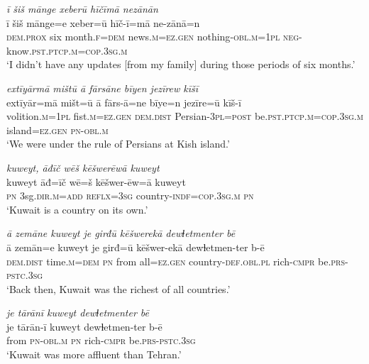 \ea \label{ŽM.36}
\textit{ī šiš mānge xeberū hīčīmā nezānān} \\ 
\gll ī šiš mānge=e xeber=ū hīč-ī=mā ne-zānā=n \\ 
 \textsc{dem.prox} six month\textsc{.f}\textsc{=dem} news\textsc{.m}\textsc{=ez.gen} nothing\textsc{-obl}\textsc{.m}\textsc{=\textsc{1pl}} \textsc{neg-}know\textsc{.pst}\textsc{.ptcp}\textsc{.m}\textsc{=cop}\textsc{.3sg}\textsc{.m} \\ 
\glt `I didn’t have any updates [from my family] during those periods of six months.'
\z 
 
\ea \label{ŽM.38}
\textit{extīyārmā mištū ā fārsāne bīyen jezīrew kīšī} \\ 
\gll extīyār=mā mišt=ū ā fārs-ā=ne bīye=n jezīre=ū kīš-ī \\ 
 volition\textsc{.m}\textsc{=\textsc{1pl}} fist\textsc{.m}\textsc{=ez.gen} \textsc{dem.dist} Persian\textsc{-3pl}\textsc{=\textsc{post}} be\textsc{.pst}\textsc{.ptcp}\textsc{.m}\textsc{=cop}\textsc{.3sg}\textsc{.m} island\textsc{=ez.gen} \textsc{pn}\textsc{-obl}\textsc{.m} \\ 
\glt `We were under the rule of Persians at Kish island.'
\z 
 
\ea \label{ŽM.42}
\textit{kuweyt, āđīč wēš kēšwerēwā kuweyt} \\ 
\gll kuweyt āđ=īč wē=š kēšwer-ēw=ā kuweyt \\ 
 \textsc{pn} 3sg\textsc{.dir}\textsc{.m}\textsc{=add} \textsc{reflx}\textsc{=3sg} country\textsc{-indf}\textsc{=cop}\textsc{.3sg}\textsc{.m} \textsc{pn} \\ 
\glt `Kuwait is a country on its own.'
\z 
 
\ea \label{ŽM.43}
\textit{ā zemāne kuweyt je girđū kēšwerekā dewɫetmenter bē} \\ 
\gll ā zemān=e kuweyt je girđ=ū kēšwer-ekā dewɫetmen-ter b-ē \\ 
 \textsc{dem.dist} time\textsc{.m}\textsc{=dem} \textsc{pn} from all\textsc{=ez.gen} country\textsc{-def}\textsc{.obl}\textsc{.pl} rich\textsc{-cmpr} be\textsc{.prs}\textsc{-pstc}\textsc{.3sg} \\ 
\glt `Back then, Kuwait was the richest of all countries.'
\z 
 
\ea \label{ŽM.44}
\textit{je tārānī kuweyt dewɫetmenter bē} \\ 
\gll je tārān-ī kuweyt dewɫetmen-ter b-ē \\ 
 from \textsc{pn}\textsc{-obl}\textsc{.m} \textsc{pn} rich\textsc{-cmpr} be\textsc{.prs}\textsc{-pstc}\textsc{.3sg} \\ 
\glt `Kuwait was more affluent than Tehran.'
\z 
 
